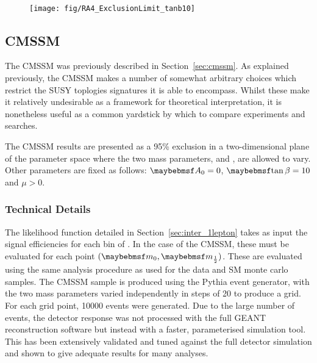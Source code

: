 \begin{figure}[h!]
\centering
{}
\\
\caption[]{}
\label{fig:inter_msugra_el}
\end{figure}

\begin{figure}[h!]
\texttt{[image: fig/RA4\_ExclusionLimit\_tanb10]}
\caption[]{}
\label{fig:inter_msugra_exclusion}
\end{figure}

\subsection{\ac{CMSSM}}
The \ac{CMSSM} was previously described in Section~\ref{sec:cmssm}. As explained
previously, the \ac{CMSSM} makes a number of somewhat arbitrary choices which
restrict the \ac{SUSY} toplogies signatures it is able to encompass. Whilst
these make it relatively undesirable as a framework for theoretical
interpretation, it is nonetheless useful as a common yardstick by which to
compare experiments and searches.

The \ac{CMSSM} results are presented as a 95\% exclusion in a two-dimensional
plane of the parameter space where the two mass parameters, \Mzero and \Mhalf,
are allowed to vary. Other parameters are fixed as follows: $\Azero = 0$,
$\tanbeta = 10$ and $\mu > 0$.

\subsubsection{Technical Details}
The likelihood function detailed in Section~\ref{sec:inter_1lepton} takes as
input the signal efficiencies for each bin of \STlep. In the case of the
\ac{CMSSM}, these must be evaluated for each point $(\Mzero, \Mhalf)$. These are
evaluated using the same analysis procedure as used for the data and \ac{SM}
monte carlo samples. The \ac{CMSSM} sample is produced using the Pythia event
generator, with the two mass parameters varied independently in steps of
\unit{20}{\GeV} to produce a grid. For each grid point, 10000 events were
generated. Due to the large number of events, the detector response was not
processed with the full \ac{GEANT} reconstruction software but instead with a
faster, parameterised simulation tool. This has been extensively validated and
tuned against the full detector simulation and shown to give adequate results
for many analyses.

